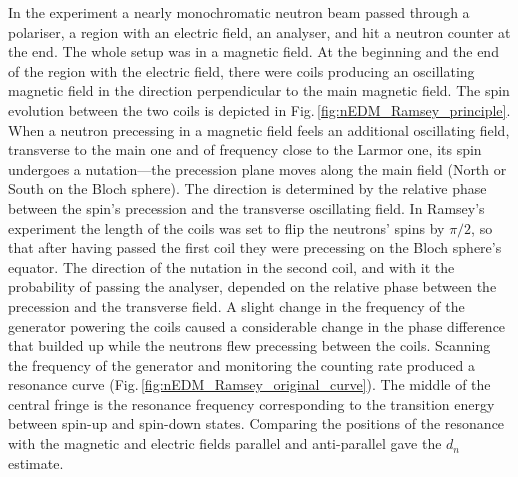 In the experiment a nearly monochromatic neutron beam passed through a polariser, a region with an electric field, an analyser, and hit a neutron counter at the end. The whole setup was in a magnetic field. At the beginning and the end of the region with the electric field, there were coils producing an oscillating magnetic field in the direction perpendicular to the main magnetic field. The spin evolution between the two coils is depicted in Fig.\,\ref{fig:nEDM_Ramsey_principle}. When a neutron precessing in a magnetic field feels an additional oscillating field, transverse to the main one and of frequency close to the Larmor one, its spin undergoes a nutation---the precession plane moves along the main field (North or South on the Bloch sphere). The direction is determined by the relative phase between the spin's precession and the transverse oscillating field. In Ramsey's experiment the length of the coils was set to flip the neutrons' spins by $\pi/2$, so that after having passed the first coil they were precessing on the Bloch sphere's equator. The direction of the nutation in the second coil, and with it the probability of passing the analyser, depended on the relative phase between the precession and the transverse field. A slight change in the frequency of the generator powering the coils caused a considerable change in the phase difference that builded up while the neutrons flew precessing between the coils. Scanning the frequency of the generator and monitoring the counting rate produced a resonance curve (Fig.\,\ref{fig:nEDM_Ramsey_original_curve}). The middle of the central fringe is the resonance frequency corresponding to the transition energy between spin-up and spin-down states. Comparing the positions of the resonance with the magnetic and electric fields parallel and anti-parallel gave the $d_n$ estimate.

